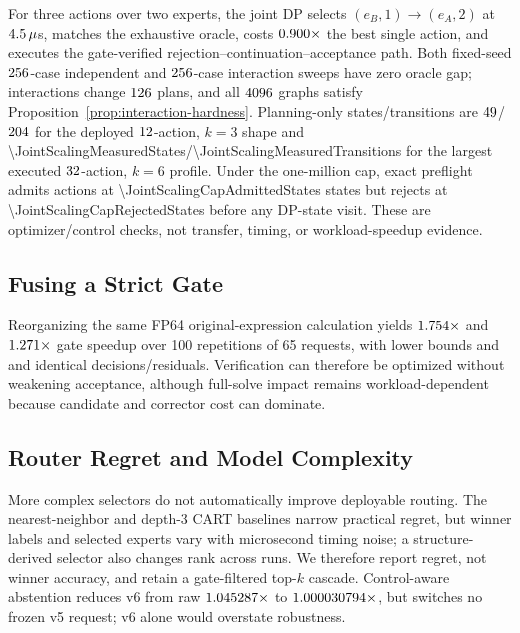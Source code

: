 For three actions over two experts, the joint DP selects
$(e_B,1)\rightarrow(e_A,2)$ at $4.5\,\mu$s, matches the exhaustive
oracle, costs $0.900\times$ the best single action, and executes the
gate-verified rejection--continuation--acceptance path. Both fixed-seed
$256$-case independent and $256$-case
interaction sweeps have zero oracle gap; interactions change
$126$ plans, and all $4096$ graphs satisfy
Proposition~\ref{prop:interaction-hardness}. Planning-only states/transitions are
$49$/$204$ for the deployed
$12$-action, $k=3$ shape and
\num{\JointScalingMeasuredStates}/\num{\JointScalingMeasuredTransitions} for the largest
executed $32$-action, $k=6$ profile. Under the one-million cap,
exact preflight admits \JointScalingCapAdmittedActions{} actions at
\num{\JointScalingCapAdmittedStates} states but rejects \JointScalingCapRejectedActions{}
at \num{\JointScalingCapRejectedStates} before any DP-state visit. These are optimizer/control
checks, not transfer, timing, or workload-speedup evidence.

\subsection{Fusing a Strict Gate}

Reorganizing the same FP64 original-expression calculation yields
$1.754\times$ and $1.271\times$ gate speedup
over 100 repetitions of 65 requests, with lower bounds \FusedLinearGateLower{} and
\FusedNonlinearGateLower{} and identical decisions/residuals. Verification can
therefore be optimized without weakening acceptance, although full-solve impact
remains workload-dependent because candidate and corrector cost can dominate.

\subsection{Router Regret and Model Complexity}

More complex selectors do not automatically improve deployable routing. The
nearest-neighbor and depth-3 CART baselines narrow practical regret, but winner labels
and selected experts vary with microsecond timing noise; a structure-derived selector
also changes rank across runs. We therefore report regret, not winner accuracy, and
retain a gate-filtered top-$k$ cascade. Control-aware abstention reduces v6 from raw
$1.045287\times$ to $1.000030794\times$, but switches no
frozen v5 request; v6 alone would overstate robustness.

